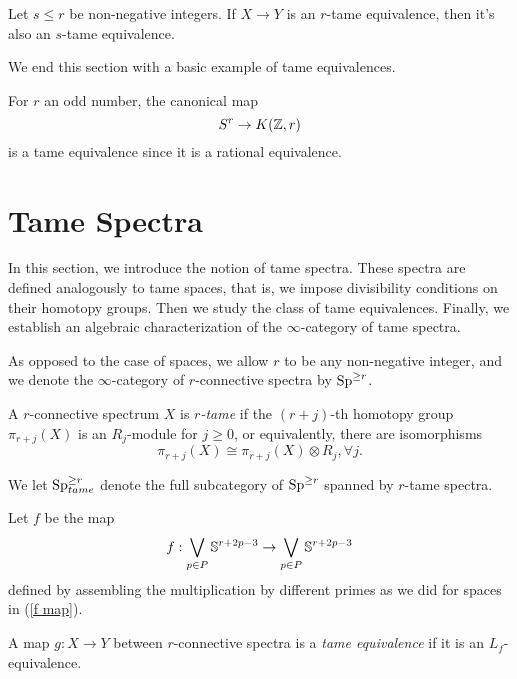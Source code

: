 \begin{remark}
	Let $s\leq r$ be non-negative integers.
	If $X\to Y$ is an $r$-tame equivalence, then it's also an $s$-tame equivalence.
\end{remark}

We end this section with a basic example of tame equivalences.
\begin{example}
\label{odd sphere is tame equivalent to EM-space}
For $r$ an odd number,
the canonical map 
$$
S^r \to K({\mathbb{Z}}, r)
$$
is a tame equivalence since it is a rational equivalence.
\end{example}

\section{Tame Spectra}
\label{Section: Tame spectra}

In this section, we introduce the notion of tame spectra.
These spectra are defined analogously to tame spaces, that is, we impose divisibility conditions on their homotopy groups.
Then we study the class of tame equivalences.
Finally, we establish an algebraic characterization of the $\infty$-category of tame spectra.

As opposed to the case of spaces, we allow $r$ to be any non-negative integer, and we denote the $\infty$-category of $r$-connective spectra by $\operatorname{Sp}^{\geq r}$.

\begin{definition}
	A $r$-connective spectrum $X$ is \emph{$r$-tame} if the $(r+j)$-th homotopy group $\pi_{r+j}(X)$ is an $R_j$-module for $j\geq 0$, or equivalently, there are isomorphisms
	\[
	\pi_{r+j}(X)\cong \pi_{r+j}(X)\otimes R_{j}, \forall j.
	\]
\end{definition}

\begin{notation}
We let $\operatorname{Sp}^{\geq r}_{tame}$ denote the full subcategory of $\operatorname{Sp}^{\geq r}$ spanned by $r$-tame spectra.
\end{notation}


Let $f$ be the map 
\begin{equation}
\label{f for spectra}
	f: \bigvee_{p\in P}{\mathbb{S}}^{r+2p-3} \to \bigvee_{p\in P}{\mathbb{S}}^{r+2p-3}
\end{equation}
defined by assembling the multiplication by different primes as we did for spaces in (\ref{f map}).
\begin{definition}
    A map $g:X \to Y$ between $r$-connective spectra is a \emph{tame equivalence} if it is an $L_f$-equivalence.
\end{definition}


